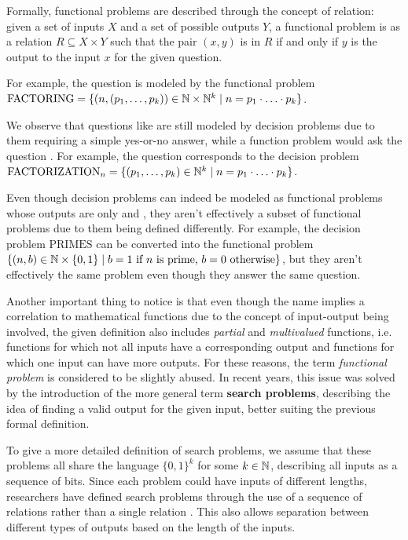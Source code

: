 Formally, functional problems are described through the concept of relation: given a set of inputs $X$ and a set of possible outputs $Y$, a functional problem is as a relation $R \subseteq X \times Y$ such that the pair $(x,y)$ is in $R$ if and only if $y$ is the output to the input $x$ for the given question.

For example, the question  is modeled by the functional problem $\mathrm{FACTORING} = \{(n, (p_1, \ldots, p_k)) \in \mathbb{N} \times \mathbb{N}^k \mid n = p_1 \cdot \ldots \cdot p_k\}$.

We observe that questions like  are still modeled by decision problems due to them requiring a simple yes-or-no answer, while a function problem would ask the question . For example, the question  corresponds to the decision problem $\mathrm{FACTORIZATION}_n = \{(p_1, \ldots, p_k) \in \mathbb{N}^k \mid n = p_1 \cdot \ldots \cdot p_k\}$.

Even though decision problems can indeed be modeled as functional problems whose outputs are only  and , they aren't effectively a subset of functional problems due to them being defined differently. For example, the decision problem $\mathrm{PRIMES}$ can be converted into the functional problem $\{(n, b) \in \mathbb{N} \times \{0,1\} \mid b = 1 \text{ if } n \text{ is prime, } b = 0 \text{ otherwise}\}$, but they aren't effectively the same problem even though they answer the same question.

Another important thing to notice is that even though the name implies a correlation to mathematical functions due to the concept of input-output being involved, the given definition also includes \textit{partial} and \textit{multivalued} functions, i.e. functions for which not all inputs have a corresponding output and functions for which one input can have more outputs. For these reasons, the term \textit{functional problem} is considered to be slightly abused. In recent years, this issue was solved by the introduction of the more general term \textbf{search problems}, describing the idea of finding a valid output for the given input, better suiting the previous formal definition.

To give a more detailed definition of search problems, we assume that these problems all share the language $\{0,1\}^k$ for some $k \in \mathbb{N}$, describing all inputs as a sequence of bits. Since each problem could have inputs of different lengths, researchers have defined search problems through the use of a sequence of relations rather than a single relation \cite{rel_comp_np_search, proofs_circuits_communication, tfnp_characterization}. This also allows separation between different types of outputs based on the length of the inputs.

